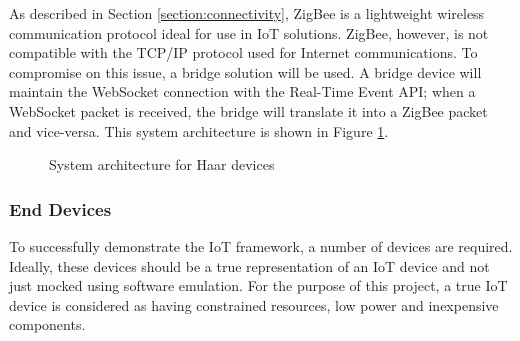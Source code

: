       As described in Section \ref{section:connectivity}, ZigBee is a lightweight wireless communication protocol ideal for use in IoT solutions. ZigBee, however, is not compatible with the TCP/IP protocol used for Internet communications. To compromise on this issue, a bridge solution will be used. A bridge device will maintain the WebSocket connection with the Real-Time Event API; when a WebSocket packet is received, the bridge will translate it into a ZigBee packet and vice-versa. This system architecture is shown in Figure \ref{figure:wsn-architecture}.

      \begin{figure}
        \centering
      \caption{System architecture for Haar devices}\label{figure:wsn-architecture}
    \end{figure}

      \subsubsection{End Devices}
        To successfully demonstrate the IoT framework, a number of devices are required. Ideally, these devices should be a true representation of an IoT device and not just mocked using software emulation. For the purpose of this project, a true IoT device is considered as having constrained resources, low power and inexpensive components.


